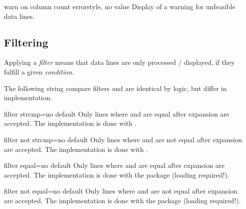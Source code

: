 \documentclass[a4paper,11pt]{ltxdoc}
\begin{document}
\begin{docCsvKey}{warn on column count error}{}{style, no value}
  Display of a warning for unfeasible data lines.
\end{docCsvKey}


\clearpage
\subsection{Filtering}\label{subsec:filtering}%

Applying a \emph{filter} means that data lines are only processed / displayed,
if they fulfill a given \emph{condition}.

The following string compare filters  and
 are identical by logic, but differ in implementation.

\begin{docCsvKey}[][doc updated=2022-10-21]{filter strcmp}{=}{no default}
  Only lines where  and  are equal after expansion
  are accepted.
  The implementation is done with .
\begin{dispExample}
\end{dispExample}
\end{docCsvKey}


\begin{docCsvKey}[][doc updated=2022-10-21]{filter not strcmp}{=}{no default}
  Only lines where  and  are not equal after expansion
  are accepted.
  The implementation is done with .
\end{docCsvKey}


\begin{docCsvKey}{filter equal}{=}{no default}
  Only lines where  and  are equal after expansion
  are accepted.
  The implementation is done with the  package (loading required!).
\end{docCsvKey}


\begin{docCsvKey}{filter not equal}{=}{no default}
  Only lines where  and  are not equal after expansion
  are accepted.
  The implementation is done with the  package (loading required!).
\end{docCsvKey}
\end{document}
